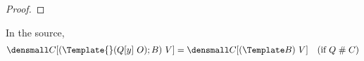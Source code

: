 \begin{proof}
\end{proof}

\begin{lemma}
  \label{thm:context-apart}
  In the source,
  \begin{align*}
    \den{C[(\Template{} (Q[y] ~ O); B) ~ V]}
    &=
    \den{C[(\Template B) ~ V]}
    &(\text{if } Q \apart C) 
  \end{align*}
\end{lemma}

